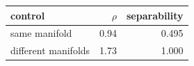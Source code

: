 \begin{tabular}{lrr}
\toprule
control & $\rho$ & separability \\
\midrule
same manifold & 0.94 & 0.495 \\
different manifolds & 1.73 & 1.000 \\
\bottomrule
\end{tabular}
